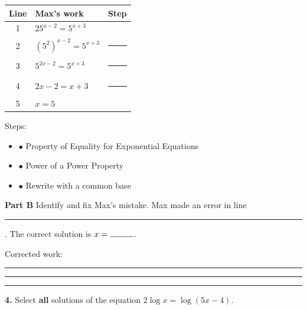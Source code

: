 \documentclass[11pt]{article}
\begin{document}
\begin{minipage}[t]{0.50\textwidth}
\vspace{0pt}
\renewcommand{\arraystretch}{1.35}
\begin{tabular}{|c|l|l|}
\hline
\textbf{Line} & \textbf{Max's work} & \textbf{Step} \\ \hline
1 & $25^{x-2}=5^{x+3}$ & \\
2 & $\left(5^2\right)^{x-2}=5^{x+3}$ & \rule{3.2cm}{0.4pt} \\
3 & $5^{2x-2}=5^{x+3}$ & \rule{3.2cm}{0.4pt} \\
4 & $2x-2=x+3$ & \rule{3.2cm}{0.4pt} \\
5 & $x=5$ & \\ \hline
\end{tabular}
\end{minipage}\hfill
\begin{minipage}[t]{0.42\textwidth}
\vspace{0pt}\raggedright
Steps:
\begin{itemize}[leftmargin=1.2em, itemsep=4pt]
\item[] $\bullet$ Property of Equality for Exponential Equations
\item[] $\bullet$ Power of a Power Property
\item[] $\bullet$ Rewrite with a common base
\end{itemize}
\end{minipage}

\vspace{2pt}
\textbf{Part B} Identify and fix Max's mistake. Max made an error in line \rule{1cm}{0.4pt}. The correct solution is $x=\rule{1cm}{0.4pt}$.

Corrected work: \rule{0.78\linewidth}{0.4pt}

\vspace{10pt}\rule{\linewidth}{0.4pt}

\vspace{2pt}\noindent\rule{\textwidth}{0.4pt}

\vspace{4pt}
\textbf{4.} Select \textbf{all} solutions of the equation $2\log x=\log(5x-4)$.
\end{document}
